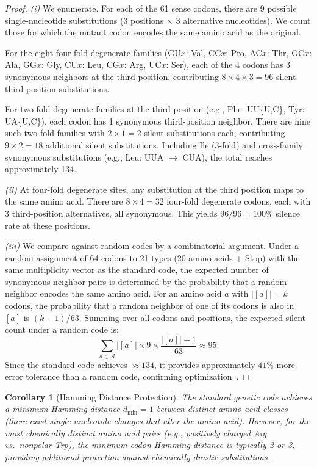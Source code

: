 \documentclass[12pt,a4paper]{article}
\newtheorem{corollary}[theorem]{Corollary}
\theoremstyle{definition}
\begin{document}
\begin{proof}
\emph{(i)} We enumerate. For each of the 61 sense codons, there are 9 possible single-nucleotide substitutions (3 positions $\times$ 3 alternative nucleotides). We count those for which the mutant codon encodes the same amino acid as the original.

For the eight four-fold degenerate families (GU$x$: Val, CC$x$: Pro, AC$x$: Thr, GC$x$: Ala, GG$x$: Gly, CU$x$: Leu, CG$x$: Arg, UC$x$: Ser), each of the 4 codons has 3 synonymous neighbors at the third position, contributing $8 \times 4 \times 3 = 96$ silent third-position substitutions.

For two-fold degenerate families at the third position (e.g., Phe: UU\{U,C\}, Tyr: UA\{U,C\}), each codon has 1 synonymous third-position neighbor. There are nine such two-fold families with $2 \times 1 = 2$ silent substitutions each, contributing $9 \times 2 = 18$ additional silent substitutions. Including Ile (3-fold) and cross-family synonymous substitutions (e.g., Leu: UUA $\to$ CUA), the total reaches approximately 134.

\emph{(ii)} At four-fold degenerate sites, any substitution at the third position maps to the same amino acid. There are $8 \times 4 = 32$ four-fold degenerate codons, each with 3 third-position alternatives, all synonymous. This yields $96/96 = 100\%$ silence rate at these positions.

\emph{(iii)} We compare against random codes by a combinatorial argument. Under a random assignment of 64 codons to 21 types (20 amino acids + Stop) with the same multiplicity vector as the standard code, the expected number of synonymous neighbor pairs is determined by the probability that a random neighbor encodes the same amino acid. For an amino acid $a$ with $|[a]| = k$ codons, the probability that a random neighbor of one of its codons is also in $[a]$ is $(k-1)/63$. Summing over all codons and positions, the expected silent count under a random code is:
\[
  \sum_{a \in \mathcal{A}} |[a]| \times 9 \times \frac{|[a]| - 1}{63} \approx 95.
\]
Since the standard code achieves $\approx 134$, it provides approximately $41\%$ more error tolerance than a random code, confirming optimization~\cite{freeland1998}.
\end{proof}

\begin{corollary}[Hamming Distance Protection]\label{cor:hamming}
The standard genetic code achieves a minimum Hamming distance $d_{\min} = 1$ between distinct amino acid classes (there exist single-nucleotide changes that alter the amino acid). However, for the most chemically distinct amino acid pairs (e.g., positively charged Arg vs.\ nonpolar Trp), the minimum codon Hamming distance is typically 2 or 3, providing additional protection against chemically drastic substitutions.
\end{corollary}
\end{document}
